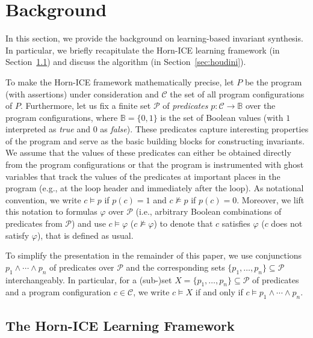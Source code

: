 
\section{Background}
\label{sec:background}

In this section, we provide the background on learning-based invariant synthesis.
In particular, we briefly recapitulate the Horn-ICE learning framework (in Section~\ref{sec:horn-ICE}) and discuss the \houdini algorithm (in Section~\ref{sec:houdini}).

To make the Horn-ICE framework mathematically precise, let $P$ be the program (with assertions) under consideration and $\mathcal C$ the set of all program configurations of $P$.
Furthermore, let us fix a finite set $\mathcal P$ of \emph{predicates}
$p \colon \mathcal C \to \mathbb B$ over the program configurations, where $\mathbb B = \{ 0, 1 \}$ is the set of Boolean values (with $1$ interpreted as \textit{true} and $0$ as \textit{false}).
These predicates capture interesting properties of the program and serve as the basic building blocks for constructing invariants.
We assume that the values of these predicates can either be obtained directly from the program configurations or that the program is instrumented with ghost variables that track the values of the predicates at important places in the program (e.g., at the loop header and immediately after the loop).
As notational convention, we write $c \models p$ if $p(c) = 1$ and $c \not\models p$ if $p(c) = 0$.
Moreover, we lift this notation to formulas $\varphi$ over $\mathcal P$ (i.e., arbitrary Boolean combinations of predicates from $\mathcal P$) and use $c \models \varphi$ ($c \not\models \varphi$) to denote that $c$ satisfies $\varphi$ ($c$ does not satisfy $\varphi$), that is defined as usual. 

To simplify the presentation in the remainder of this paper, we use conjunctions $p_1 \land \cdots \land p_n$ of predicates over $\mathcal P$ and the corresponding sets $\{ p_1, \ldots, p_n \} \subseteq \mathcal P$ interchangeably.
In particular, for a (sub-)set $X = \{ p_1, \ldots, p_n \} \subseteq \mathcal P$ of predicates and a program configuration $c \in \mathcal C$, we write $c \models X$ if and only if $c \models p_1 \land \cdots \land p_n$.


\subsection{The Horn-ICE Learning Framework}
\label{sec:horn-ICE}

